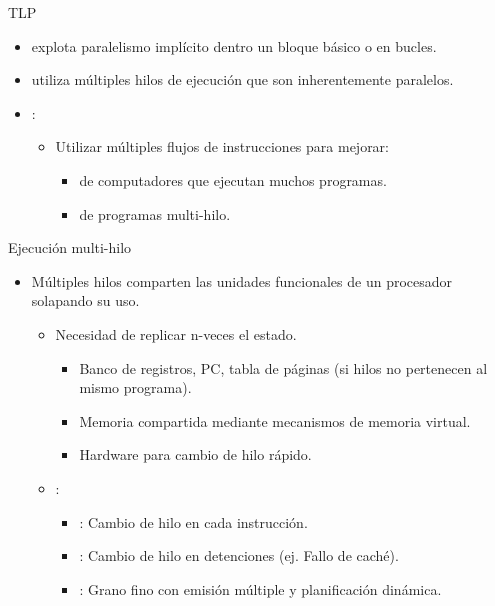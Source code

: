 \begin{frame}[t]{TLP}
\begin{itemize}
  \item {} explota paralelismo implícito dentro un bloque básico
        o en bucles.

  \item {} utiliza múltiples hilos de ejecución que son 
        inherentemente paralelos.

  \item {}:
    \begin{itemize}
      \item Utilizar múltiples flujos de instrucciones para mejorar:
        \begin{itemize}
          \item {} de computadores que ejecutan muchos programas.
          \item {} de programas multi-hilo.
        \end{itemize}
    \end{itemize}
\end{itemize}
\end{frame}

\begin{frame}[t]{Ejecución multi-hilo}
\begin{itemize}
  \item Múltiples hilos comparten las unidades funcionales de un procesador solapando su uso.
    \begin{itemize}
      \item Necesidad de replicar n-veces el estado.
        \begin{itemize}
          \item Banco de registros, PC, tabla de páginas (si hilos no pertenecen al mismo programa).
          \item Memoria compartida mediante mecanismos de memoria virtual.
          \item Hardware para cambio de hilo rápido.
        \end{itemize}

      \item {}:
        \begin{itemize}
          \item {}: Cambio de hilo en cada instrucción.
          \item {}: Cambio de hilo en detenciones (ej. Fallo de caché).
          \item {}: Grano fino con emisión múltiple y planificación dinámica.
        \end{itemize}
    \end{itemize}
\end{itemize}
\end{frame}

